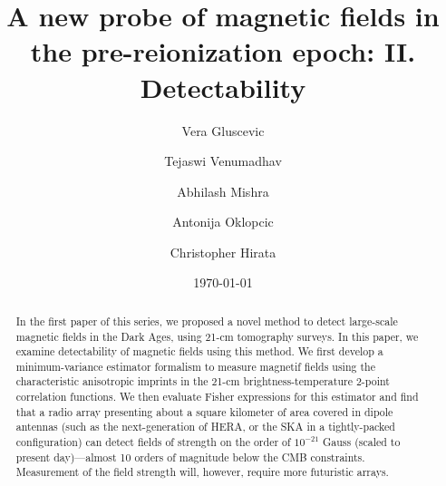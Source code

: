\documentclass[aps,prd,twocolumn,floatfix,showpacs,superscriptaddress,nofootinbib]{revtex4-1}
\begin{document}
\widetext
\title{A new probe of magnetic fields in the pre-reionization epoch: II. Detectability}
\author{Vera Gluscevic}
\author{Tejaswi Venumadhav}
\author{Abhilash Mishra} 
\author{Antonija Oklopcic}
\author{Christopher Hirata}
\date{\today}
 

\begin{abstract}
In the first paper of this series, we proposed a novel method to detect large-scale magnetic fields in the Dark Ages, using 21-cm tomography surveys. In this paper, we examine detectability of magnetic fields using this method. We first develop a minimum-variance estimator formalism to measure magnetif fields using the characteristic anisotropic imprints in the 21-cm brightness-temperature 2-point correlation functions. We then evaluate Fisher expressions for this estimator and find that a radio array presenting about a square kilometer of area covered in dipole antennas (such as the next-generation of HERA, or the SKA in a tightly-packed configuration) can detect fields of strength on the order of $10^{-21}$ Gauss (scaled to present day)---almost 10 orders of magnitude below the CMB constraints. Measurement of the field strength will, however, require more futuristic arrays.%
\end{abstract} 

\pacs{} 
\maketitle

\vspace{-15pt}






  
\appendix 

\label{app:Vrms}



\end{document}
